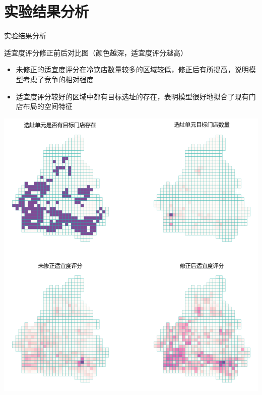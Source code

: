 \documentclass{beamer}
\begin{document}
\section{实验结果分析}
\begin{frame}{实验结果分析}
    \begin{minipage}{0.37\textwidth}
        适宜度评分修正前后对比图{\footnotesize（颜色越深，适宜度评分越高）}
        \small
        \begin{itemize}
            \item 未修正的适宜度评分在冷饮店数量较多的区域较低，修正后有所提高，说明模型考虑了竞争的相对强度
            \item 适宜度评分较好的区域中都有目标选址的存在，表明模型很好地拟合了现有门店布局的空间特征
        \end{itemize}
  
      \end{minipage}
      \hfill
      \begin{minipage}{0.6\textwidth}
        \includegraphics[width=1\textwidth]{pic/result1.png}
      \end{minipage}
\end{frame}
\end{document}
